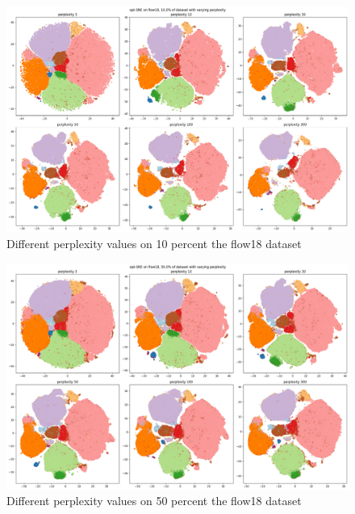 \begin{figure}[ht]
    \centering 
    \includegraphics[width=\linewidth]{figures/perp_flow_1.png}
    \caption{Different perplexity values on 10 percent the flow18 dataset}
    \label{fig:perp1}
\end{figure}

\begin{figure}[ht]
    \centering 
    \includegraphics[width=\linewidth]{figures/perp_flow_5.png}
    \caption{Different perplexity values on 50 percent the flow18 dataset}
    \label{fig:perp5}
\end{figure}
